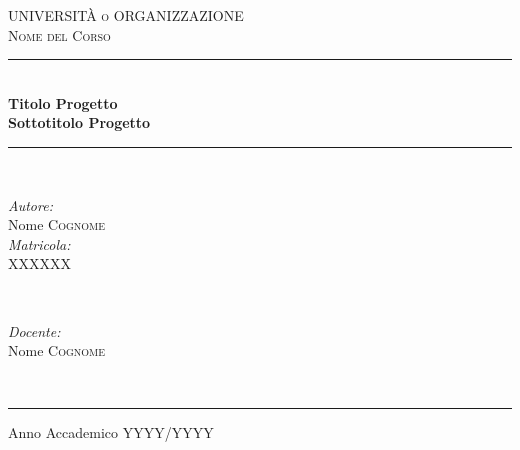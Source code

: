 

\begin{titlepage}

\newcommand{\HRule}{\rule{\linewidth}{0.5mm}} 

\newcommand{\UniversityName}{\textsc{\LARGE UNIVERSITÀ o ORGANIZZAZIONE}}

\center 

\UniversityName\\[1cm]
\textsc{\Large Nome del Corso}\\[0.5cm] 

\HRule \\[0.4cm]
{\Huge \bfseries Titolo Progetto}\\[0.4cm]
{\Large \bfseries Sottotitolo Progetto}\\
\HRule \\[1.5cm]

\begin{minipage}[t]{0.4\textwidth}
\begin{flushleft} \large
\emph{Autore:}\\
Nome \textsc{Cognome}\\
\emph{Matricola:}\\
XXXXXX
\end{flushleft}
\end{minipage}
~
\begin{minipage}[t]{0.5\textwidth}
\begin{flushright} \large
\emph{Docente:}\\
Nome \textsc{Cognome}\\
\end{flushright}
\end{minipage}\\

\vfill

\rule{0.8\textwidth}{0.4pt}
\begin{center}
    {\large Anno Accademico YYYY/YYYY}
\end{center}

\end{titlepage}


